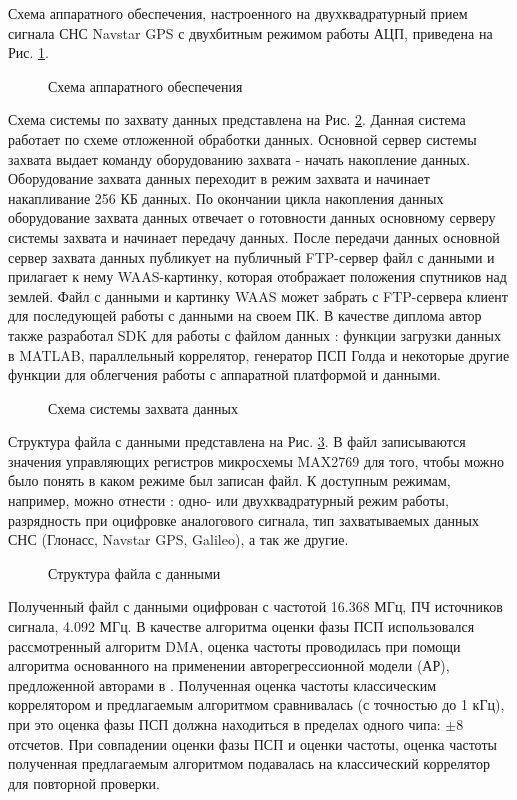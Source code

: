 Схема аппаратного обеспечения, настроенного на двухквадратурный прием сигнала СНС Navstar GPS с двухбитным режимом работы АЦП, приведена на Рис. \ref{pic:board_scheme}.
\begin{figure}[h]
	\center{}
	\caption{Схема аппаратного обеспечения}
	\label{pic:board_scheme}
\end{figure}

Схема системы по захвату данных представлена на Рис. \ref{pic:gps_acq_system_scheme}. Данная система работает по схеме отложенной обработки данных. Основной сервер системы захвата
выдает команду оборудованию захвата - начать накопление данных. Оборудование захвата данных переходит в режим захвата и начинает накапливание 256 КБ данных. По окончании цикла
накопления данных оборудование захвата данных отвечает о готовности данных основному серверу системы захвата и начинает передачу данных. После передачи данных основной сервер
захвата данных публикует на публичный FTP-сервер файл с данными и прилагает к нему WAAS-картинку, которая отображает положения спутников над землей. Файл с данными
и картинку WAAS может забрать с FTP-сервера клиент для последующей работы с данными на своем ПК. В качестве диплома автор также разработал SDK для работы с файлом данных
\cite{github-gpsproject}: функции загрузки данных в MATLAB, параллельный коррелятор, генератор ПСП Голда и некоторые другие функции для облегчения работы с аппаратной платформой
и данными.

\begin{figure}[h]
	\center{}
	\caption{Схема системы захвата данных}
	\label{pic:gps_acq_system_scheme}
\end{figure}

Структура файла с данными представлена на Рис. \ref{pic:dump_file}. В файл записываются значения управляющих регистров микросхемы MAX2769 для того, чтобы можно было
понять в каком режиме был записан файл. К доступным режимам, например, можно отнести \cite{max2769_manual}: одно- или двухквадратурный режим работы, разрядность при оцифровке
аналогового сигнала, тип захватываемых данных СНС (Глонасс, Navstar GPS, Galileo), а так же другие.
\begin{figure}[h]
	\center{}
	\caption{Структура файла с данными}
	\label{pic:dump_file}
\end{figure}

Полученный файл с данными оцифрован с частотой 16.368 МГц, ПЧ источников сигнала, 4.092 МГц. В качестве алгоритма оценки фазы ПСП использовался рассмотренный алгоритм DMA,
оценка частоты проводилась при помощи алгоритма основанного на применении авторегрессионной модели (АР), предложенной авторами в \cite{my_otchet}. Полученная оценка
частоты классическим коррелятором и предлагаемым алгоритмом сравнивалась (с точностью до 1 кГц), при это оценка фазы ПСП должна находиться в пределах одного чипа: ${\pm 8}$
отсчетов. При совпадении оценки фазы ПСП и оценки частоты, оценка частоты полученная предлагаемым алгоритмом подавалась на классический коррелятор для повторной проверки.

